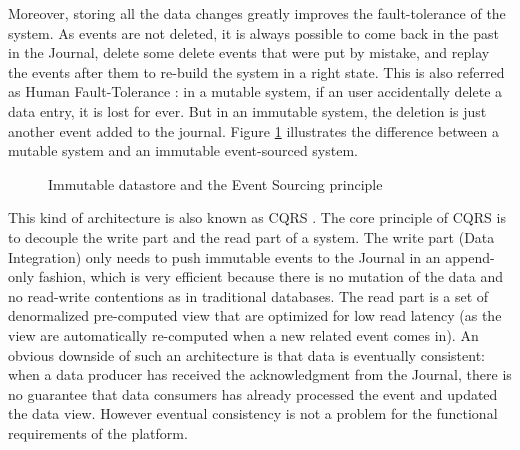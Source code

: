Moreover, storing all the data changes greatly improves the fault-tolerance of the system. As events are not deleted, it is always possible 
to come back in the past in the Journal, delete some delete events that were put by mistake, and replay the events after
them to re-build the system in a right state. This is also referred as Human Fault-Tolerance : in a mutable system,
if an user accidentally delete a data entry, it is lost for ever. But in an immutable system, the deletion is just another
event added to the journal. Figure \ref{fig:event-sourcing} illustrates the difference between a mutable system and an immutable event-sourced system.
\\ 
\begin{figure}[h]
  \begin{center}
    \caption{Immutable datastore and the Event Sourcing principle}
    \label{fig:event-sourcing}
  \end{center}
\end{figure}

This kind of architecture is also known as CQRS . The core principle of CQRS is to decouple the write part and the read part
of a system. The write part (Data Integration) only needs to push immutable events to the Journal in an append-only fashion, which
is very efficient because there is no mutation of the data and no read-write contentions as in traditional databases.
The read part is a set of denormalized pre-computed view that are optimized for low read latency (as the view are automatically re-computed
when a new related event comes in).
An obvious downside of such an architecture is that data is eventually consistent: when a data producer has received the acknowledgment
from the Journal, there is no guarantee that data consumers has already processed the event and updated the data view. However eventual consistency is not
a problem for the functional requirements of the platform.

